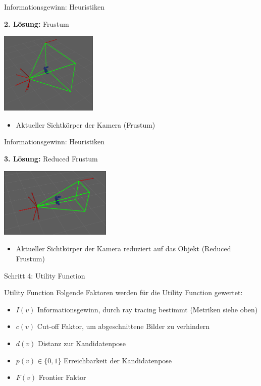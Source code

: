 \documentclass[aspectratio=169]{beamer}
\begin{document}
\begin{frame}{Informationsgewinn: Heuristiken}
	\begin{block}{\textbf{2. Lösung:} Frustum}
		\begin{center}
			\includegraphics[width=0.35\textwidth]{Graphics/frustum_2.png}
		\end{center}
		\begin{itemize}
			\item Aktueller Sichtkörper der Kamera (Frustum)
		\end{itemize}
	\end{block}
\end{frame}

\begin{frame}{Informationsgewinn: Heuristiken}
	\begin{block}{\textbf{3. Lösung:} Reduced Frustum}
		\begin{center}
			\includegraphics[width=0.4\textwidth]{Graphics/reduced_frustum.png}
		\end{center}
		\begin{itemize}
			\item Aktueller Sichtkörper der Kamera reduziert auf das Objekt (Reduced Frustum)
		\end{itemize}
	\end{block}
\end{frame}

\begin{frame}{Schritt 4: Utility Function}

	\begin{block}{Utility Function}
		Folgende Faktoren werden für die Utility Function gewertet:
		\begin{itemize}
			\item $I(v)$ Informationsgewinn, durch ray tracing bestimmt (Metriken siehe oben)
			\item $c(v)$ Cut-off Faktor, um abgeschnittene Bilder zu verhindern
			\item $d(v)$ Distanz zur Kandidatenpose
			\item $p(v) \in \{0,1\}$ Erreichbarkeit der Kandidatenpose
			\item $F(v)$ Frontier Faktor
		\end{itemize}
	\end{block}
\end{frame}
\end{document}
